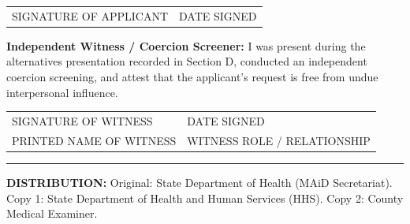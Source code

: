 \documentclass[10pt]{article}
\begin{document}
\vspace{0.5em}
\noindent\begin{tabularx}{\textwidth}{X X}
SIGNATURE OF APPLICANT\hrulefill & DATE SIGNED\hrulefill \\
\end{tabularx}

\vspace{1em}
\noindent\textbf{Independent Witness / Coercion Screener:} I was present during the alternatives presentation recorded in Section D, conducted an independent coercion screening, and attest that the applicant's request is free from undue interpersonal influence.

\vspace{0.5em}
\noindent\begin{tabularx}{\textwidth}{X X}
SIGNATURE OF WITNESS\hrulefill & DATE SIGNED\hrulefill \\
PRINTED NAME OF WITNESS\hrulefill & WITNESS ROLE / RELATIONSHIP\hrulefill \\
\end{tabularx}

\vspace{1em}
\hrule
\vspace{0.5em}
\noindent\small\textbf{DISTRIBUTION:} Original: State Department of Health (MAiD Secretariat). Copy 1: State Department of Health and Human Services (HHS). Copy 2: County Medical Examiner.
\end{document}
